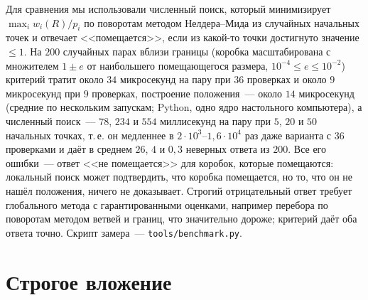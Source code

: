 \documentclass[11pt]{article}
\theoremstyle{definition}
\theoremstyle{remark}
\begin{document}
Для сравнения мы использовали численный поиск, который минимизирует $\max_iw_i(R)/p_i$ по поворотам
методом Нелдера--Мида из случайных начальных точек и отвечает <<помещается>>, если из какой-то точки
достигнуто значение $\le1$. На $200$ случайных парах вблизи границы (коробка масштабирована с
множителем $1\pm e$ от наибольшего помещающегося размера, $10^{-4}\le e\le10^{-2}$) критерий тратит около
$34$ микросекунд на пару при $36$ проверках и около $9$ микросекунд при $9$ проверках, построение
положения~--- около $14$ микросекунд (средние по нескольким запускам; Python, одно ядро настольного
компьютера), а численный поиск~--- $78$, $234$ и $554$ миллисекунд на пару при $5$, $20$ и $50$
начальных точках, т.\,е. он медленнее в $2\cdot10^3$--$1{,}6\cdot10^4$ раз даже варианта с $36$
проверками и даёт в среднем $26$, $4$ и $0{,}3$ неверных ответа из $200$. Все его ошибки~--- ответ <<не помещается>> для коробок, которые помещаются:
локальный поиск может подтвердить, что коробка помещается, но то, что он не нашёл положения, ничего
не доказывает. Строгий отрицательный ответ требует глобального метода с гарантированными оценками,
например перебора по поворотам методом ветвей и границ, что значительно дороже; критерий даёт оба
ответа точно. Скрипт замера~--- \texttt{tools/benchmark.py}.

\section{Строгое вложение}\label{sec:strict}
\end{document}
